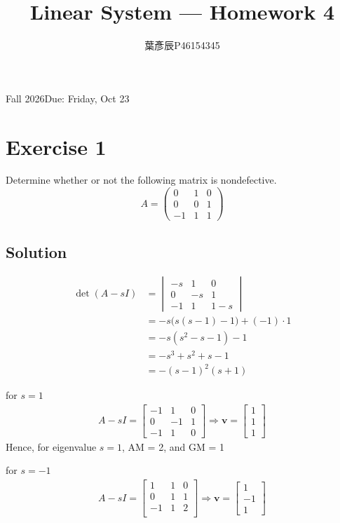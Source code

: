 \documentclass[12pt,a4paper]{article}
\title{Linear System --- Homework 4}
\author{葉彥辰\quad P46154345}
\date{}
\begin{document}
\maketitle
\begin{center}Fall 2026\quad Due: Friday, Oct 23\end{center}

\section*{Exercise 1}
Determine whether or not the following matrix is nondefective.
\[
A=\begin{pmatrix}0&1&0\\0&0&1\\-1&1&1\end{pmatrix}
\]
\subsection*{Solution}

\begin{align*}
	\det (A-sI) &= \begin{vmatrix}
		-s & 1 & 0 \\
		0 & -s & 1 \\
		-1 & 1 & 1 - s
	\end{vmatrix} \\
	&= -s \bigg( s(s-1) -1 \bigg ) + (-1)\cdot 1  \\
	&= -s(s^2 -s -1) - 1 \\
	&= -s^3 + s^2 + s - 1 \\
	&= -(s-1)^2(s+1) 
\end{align*}

for $s = 1$
\begin{align*}
	A - sI = \begin{bmatrix}
		-1 & 1 & 0 \\
		0 & -1 & 1 \\
		-1 & 1 & 0
	\end{bmatrix} \Rightarrow \mathbf v = \begin{bmatrix}
	1 \\ 1\\1
	\end{bmatrix}
\end{align*}
Hence, for eigenvalue $s = 1$, AM = 2, and GM = 1

 
for $s = -1$
\begin{align*}
	A - sI = \begin{bmatrix}
		1 & 1 & 0 \\
		0 & 1 & 1 \\
		-1 & 1 & 2\\
	\end{bmatrix} \Rightarrow \mathbf v = \begin{bmatrix}
	1 \\ -1 \\ 1
	\end{bmatrix}
\end{align*}
\end{document}
